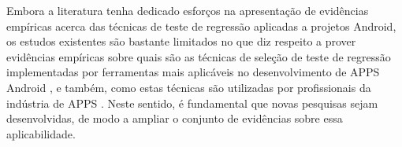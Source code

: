 Embora a literatura tenha dedicado esforços na apresentação de evidências empíricas acerca das técnicas de teste de regressão aplicadas a projetos Android, os estudos existentes são bastante limitados no que diz respeito a prover evidências empíricas sobre quais são as técnicas de seleção de teste de regressão implementadas por ferramentas mais aplicáveis no desenvolvimento de \ac{APPS} Android \cite{8377661,Do2016RedroidAR}, e também, como estas técnicas são utilizadas por profissionais da indústria de \ac{APPS} \cite{8094467, 7102609, ROY:2015}. Neste sentido, é fundamental que novas pesquisas sejam desenvolvidas, de modo a ampliar o conjunto de evidências sobre essa aplicabilidade.

